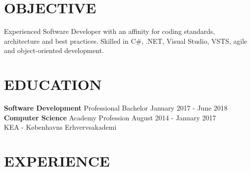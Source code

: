 \documentclass[margin, 10pt, hidelinks]{res} %
\newcommand{\emphasize}{\large\bfseries} %
\begin{document}
\begin{resume}


 \section{OBJECTIVE}

Experienced Software Developer with an affinity for coding standards, 
architecture and best practices. Skilled in C\#, .NET, Visual Studio, VSTS, agile and object-oriented development.


\section{EDUCATION}

{\emphasize Software Development}  Professional Bachelor   \hfill  January 2017 - June 2018\\
{\emphasize Computer Science}  Academy Profession  \hfill  August 2014 - January 2017 \\
KEA - Københavns Erhvervsakademi 	


\section{EXPERIENCE}


\end{resume}
\end{document}
